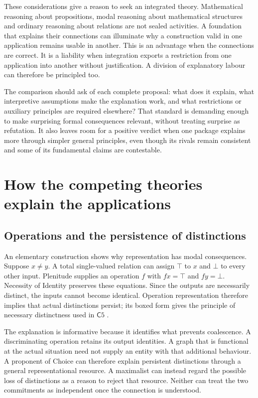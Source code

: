 \documentclass[11pt]{article}
\newcommand{\C}{\mathsf C}
\begin{document}
These considerations give a reason to seek an integrated theory. Mathematical reasoning about propositions, modal reasoning about mathematical structures and ordinary reasoning about relations are not sealed activities. A foundation that explains their connections can illuminate why a construction valid in one application remains usable in another. This is an advantage when the connections are correct. It is a liability when integration exports a restriction from one application into another without justification. A division of explanatory labour can therefore be principled too.

The comparison should ask of each complete proposal: what does it explain, what interpretive assumptions make the explanation work, and what restrictions or auxiliary principles are required elsewhere? That standard is demanding enough to make surprising formal consequences relevant, without treating surprise as refutation. It also leaves room for a positive verdict when one package explains more through simpler general principles, even though its rivals remain consistent and some of its fundamental claims are contestable.

\section{How the competing theories explain the applications}\label{sec:comparison}

\subsection{Operations and the persistence of distinctions}

An elementary construction shows why representation has modal consequences. Suppose $x\ne y$. A total single-valued relation can assign $\top$ to $x$ and $\bot$ to every other input. Plenitude supplies an operation $f$ with $fx=\top$ and $fy=\bot$. Necessity of Identity preserves these equations. Since the outputs are necessarily distinct, the inputs cannot become identical. Operation representation therefore implies that actual distinctions persist; its boxed form gives the principle of necessary distinctness used in $\C5$ \citep[\S2.3, Proposition~2.13]{bacondorr}.

The explanation is informative because it identifies what prevents coalescence. A discriminating operation retains its output identities. A graph that is functional at the actual situation need not supply an entity with that additional behaviour. A proponent of Choice can therefore explain persistent distinctions through a general representational resource. A maximalist can instead regard the possible loss of distinctions as a reason to reject that resource. Neither can treat the two commitments as independent once the connection is understood.
\end{document}
